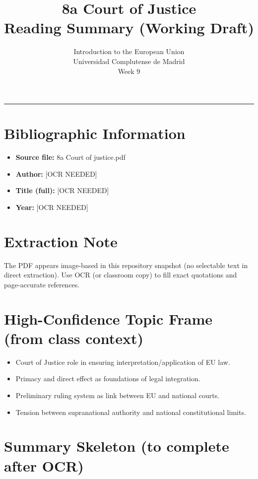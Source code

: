 \documentclass[11pt,a4paper]{article}
\begin{document}
\title{8a Court of Justice\\Reading Summary (Working Draft)}
\author{Introduction to the European Union\\Universidad Complutense de Madrid\\Week 9}
\date{}
\maketitle
\vspace{-1em}
\hrule
\vspace{1em}

\section*{Bibliographic Information}
\begin{itemize}
\item \textbf{Source file:} 8a Court of justice.pdf
\item \textbf{Author:} [OCR NEEDED]
\item \textbf{Title (full):} [OCR NEEDED]
\item \textbf{Year:} [OCR NEEDED]
\end{itemize}

\section*{Extraction Note}
The PDF appears image-based in this repository snapshot (no selectable text in direct extraction).
Use OCR (or classroom copy) to fill exact quotations and page-accurate references.

\section*{High-Confidence Topic Frame (from class context)}
\begin{itemize}
\item Court of Justice role in ensuring interpretation/application of EU law.
\item Primacy and direct effect as foundations of legal integration.
\item Preliminary ruling system as link between EU and national courts.
\item Tension between supranational authority and national constitutional limits.
\end{itemize}

\section*{Summary Skeleton (to complete after OCR)}
\end{document}
